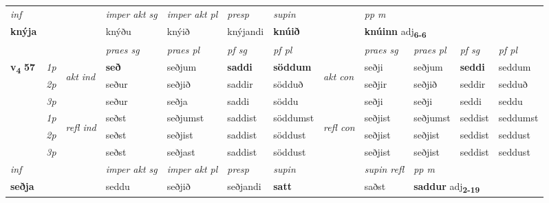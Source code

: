 \begin{longtable}[l]{X>{\footnotesize\itshape}llXXXXlXXXX}
   {\textit{inf}} & &  & \textit{imper akt sg} & \textit{imper akt pl}   & \textit{presp} & \textit{supin}  && \textit{pp m} \\*
  {\textbf{knýja}} & && knýðu  & knýið   & knýjandi &  \textbf{knúið}  && \multicolumn{2}{l}{\textbf{knúinn} adj\textbf{\textsubscript{6-6}}} \\*

\midrule

 & &   & \textit{praes sg}  & \textit{praes pl}    & \textit{ pf sg} & \textit{pf pl} & & \textit{praes sg}  & \textit{praes pl}    & \textit{pf sg} & \textit{pf pl }  \\ \cmidrule{4-7} \cmidrule{9-12}
 \multirow{2}{*}{{{\textbf{v{\textsubscript{4}}} \Large{\textbf{57}}}}}  & 1p & \multirow{3}{*}{\begin{turn}{90}\textit{akt ind}\end{turn}} & \textbf{seð} & seðjum & \textbf{saddi} & \textbf{söddum} & \multirow{3}{*}{\begin{turn}{90}\textit{akt con}\end{turn}} &seðji & seðjum & \textbf{seddi} & seddum\\*
 & 2p &  &  seður  & seðjið & saddir & södduð & & seðjir & seðjið & seddir & sedduð \\*
 & 3p &  & seður & seðja & saddi & söddu & & seðji & seðji& seddi & seddu \\*
\cmidrule{4-7} \cmidrule{9-12}
 & 1p & \multirow{3}{*}{\begin{turn}{90}\textit{refl ind}\end{turn}}  & seðst & seðjumst & saddist & söddumst & \multirow{3}{*}{\begin{turn}{90}\textit{refl con}\end{turn}}  &seðjist & seðjumst & seddist & seddumst \\*
 & 2p &  & seðst & seðjist & saddist & söddust & &seðjist & seðjist & seddist & seddust \\*
 & 3p  & & seðst & seðjast & saddist & söddust & & seðjist & seðjist& seddist & seddust \\*
\cmidrule{4-7} \cmidrule{9-12}

   {\textit{inf}} & &  & \textit{imper akt sg} & \textit{imper akt pl}   & \textit{presp} & \textit{supin} && \textit{supin refl} & \textit{pp m} \\*
  {\textbf{seðja}} & && seddu  & seðjið   & seðjandi &  \textbf{satt} && saðst & \multicolumn{2}{l}{\textbf{saddur} adj\textbf{\textsubscript{2-19}}} \\*


\end{longtable}
